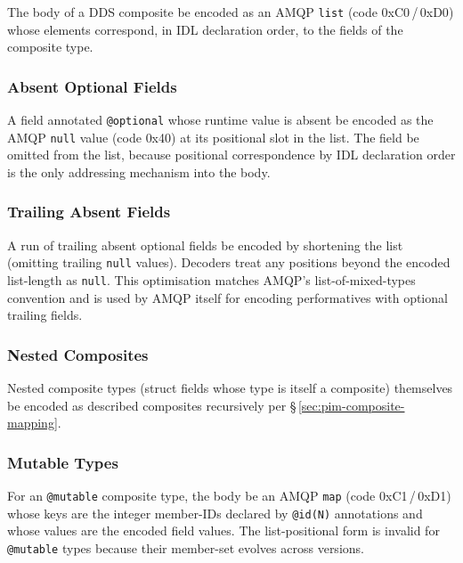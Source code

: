 \documentclass{../styles/zerodds-vendor-spec}
\begin{document}
The body of a DDS composite  be encoded as an AMQP
\texttt{list} (code \textsf{0xC0}\,/\,\textsf{0xD0}) whose
elements correspond, in IDL declaration order, to the fields of
the composite type.

\subsubsection{Absent Optional Fields}

A field annotated \texttt{@optional} whose runtime value is absent
 be encoded as the AMQP \texttt{null} value (code
\textsf{0x40}) at its positional slot in the list. The field
 be omitted from the list, because positional
correspondence by IDL declaration order is the only addressing
mechanism into the body.

\subsubsection{Trailing Absent Fields}

A run of trailing absent optional fields  be encoded by
shortening the list (omitting trailing \texttt{null} values).
Decoders  treat any positions beyond the encoded
list-length as \texttt{null}. This optimisation matches AMQP's
list-of-mixed-types convention and is used by AMQP itself for
encoding performatives with optional trailing fields.

\subsubsection{Nested Composites}

Nested composite types (struct fields whose type is itself a
composite)  themselves be encoded as described
composites recursively per \S\,\ref{sec:pim-composite-mapping}.

\subsubsection{Mutable Types}

For an \texttt{@mutable} composite type, the body 
be an AMQP \texttt{map} (code \textsf{0xC1}\,/\,\textsf{0xD1})
whose keys are the integer member-IDs declared by
\texttt{@id(N)} annotations and whose values are the encoded
field values. The list-positional form is invalid for
\texttt{@mutable} types because their member-set evolves across
versions.
\end{document}
